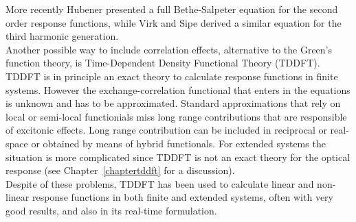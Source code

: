 More recently Hubener\cite{PhysRevA.83.062122} presented a full Bethe-Salpeter equation for the second order response functions, while Virk and Sipe derived a similar equation for the third harmonic generation.\cite{PhysRevB.56.1787}\\
Another possible way to include correlation effects, alternative to the Green's function theory, is Time-Dependent Density Functional Theory (TDDFT)\cite{PhysRevLett.52.997}. TDDFT is in principle an exact theory to calculate response functions in finite systems. However the exchange-correlation functional that enters in the equations is unknown and has to be approximated. Standard approximations that rely on local or semi-local functionials miss long range contributions that are responsible of excitonic effects\cite{botti2007time}. Long range contribution can be included in reciprocal or real-space or obtained by means of hybrid functionals\cite{botti2007time,faber2014excited}. For extended systems the situation is more complicated since TDDFT is not an exact theory for the optical response (see Chapter~\ref{chaptertddft} for a discussion).\\
Despite of these problems, TDDFT has been used to calculate linear and non-linear response functions in both finite and extended systems, often with very good results, and also in its real-time formulation.\cite{takimoto:154114,andrade2007time} 
